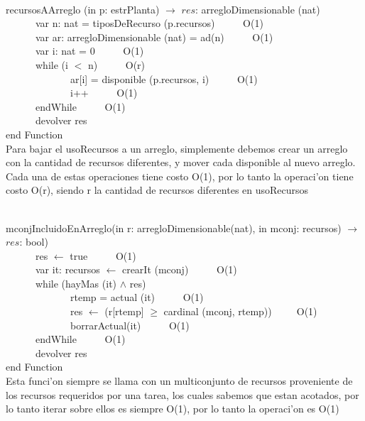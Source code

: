\documentclass[a4paper,10pt]{article}
\begin{document}
\begin{algoritmo}
\caption{}\\
recursosAArreglo (in p: estrPlanta) $\rightarrow$ $res$: arregloDimensionable (nat) \\
	\indent \ \ \ \ \ \  var n: nat = tiposDeRecurso (p.recursos)  \ \ \ \ \ O(1)\\
	\indent \ \ \ \ \ \  var ar: arregloDimensionable (nat) = ad(n)  \ \ \ \ \ O(1)\\  
	\indent \ \ \ \ \ \  var i: nat = 0  \ \ \ \ \ O(1)\\  
	\indent \ \ \ \ \ \  while (i $<$ n)  \ \ \ \ \ O(r)\\
	\indent \ \ \ \ \ \ \ \ \ \ \ \ \ ar[i] = disponible (p.recursos, i) \ \ \ \ \ O(1) \\
	\indent \ \ \ \ \ \ \ \ \ \ \ \ \ i++ \ \ \ \ \ O(1) \\
	\indent \ \ \ \ \ \  endWhile \ \ \ \ \ O(1)\\ 
	\indent \ \ \ \ \ \  devolver res    \\
   end Function \\

Para bajar el usoRecursos a un arreglo, simplemente debemos crear un arreglo con la cantidad de recursos diferentes, y mover cada disponible al nuevo arreglo. Cada una de estas operaciones tiene costo O(1), por lo tanto la operaci'on tiene costo O(r), siendo r la cantidad de recursos diferentes en usoRecursos

\end{algoritmo}

\begin{algoritmo}
\caption{}\\
  mconjIncluidoEnArreglo(in r: arregloDimensionable(nat), in mconj: recursos) $\rightarrow$ $res$: bool) \\
	\indent \ \ \ \ \ \ res $\gets$ true  \ \ \ \ \ O(1)\\
	\indent \ \ \ \ \ \ var it: recursos $\gets$ crearIt (mconj)  \ \ \ \ \ O(1)\\ 
	\indent \ \ \ \ \ \ while (hayMas (it) $\wedge$ res)  \ \ \ \ \ \\
	\indent \ \ \ \ \ \ \ \ \ \ \ \ \ rtemp = actual (it) \ \ \ \ \ O(1) \\
	\indent \ \ \ \ \ \ \ \ \ \ \ \ \ res $\gets$ (r[rtemp] $\geq$ cardinal (mconj, rtemp))\ \ \ \ \ O(1) \\
	\indent \ \ \ \ \ \ \ \ \ \ \ \ \ borrarActual(it) \ \ \ \ \ O(1) \\
	\indent \ \ \ \ \ \ endWhile \ \ \ \ \ O(1)\\
	\indent \ \ \ \ \ \ devolver res \ \ \ \ \ \\
   end Function \\

Esta funci'on siempre se llama con un multiconjunto de recursos proveniente de los recursos requeridos por una tarea, los cuales sabemos que estan acotados, por lo tanto iterar sobre ellos es siempre O(1), por lo tanto la operaci'on es O(1)

\end{algoritmo}
\end{document}
